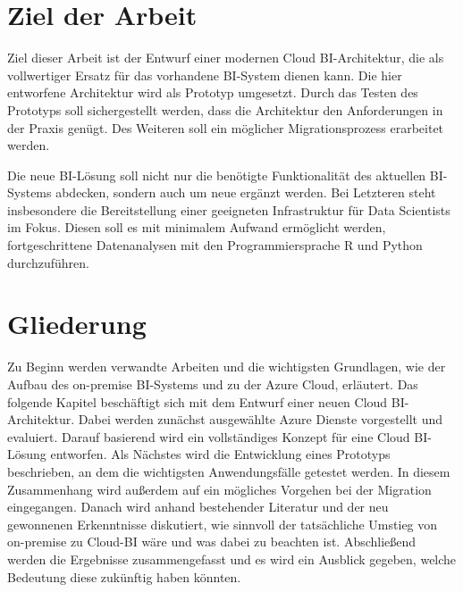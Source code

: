 \section{Ziel der Arbeit} \label{sec:intro:ziele}
Ziel dieser Arbeit ist der Entwurf einer modernen Cloud BI-Architektur, die als vollwertiger Ersatz für das vorhandene BI-System dienen kann. Die hier entworfene Architektur wird als Prototyp umgesetzt. Durch das Testen des Prototyps soll sichergestellt werden, dass die Architektur den Anforderungen in der Praxis genügt. Des Weiteren soll ein möglicher Migrationsprozess erarbeitet werden.

Die neue BI-Lösung soll nicht nur die benötigte Funktionalität des aktuellen BI-Systems abdecken, sondern auch um neue ergänzt werden. Bei Letzteren steht insbesondere die Bereitstellung einer geeigneten Infrastruktur für Data Scientists im Fokus. Diesen soll es mit minimalem Aufwand ermöglicht werden, fortgeschrittene Datenanalysen mit den Programmiersprache R und Python durchzuführen.

\section{Gliederung} \label{sec:intro:struktur}
Zu Beginn werden verwandte Arbeiten und die wichtigsten Grundlagen, wie der Aufbau des on-premise BI-Systems und zu der Azure Cloud, erläutert. Das folgende Kapitel beschäftigt sich mit dem Entwurf einer neuen Cloud BI-Architektur. Dabei werden zunächst ausgewählte Azure Dienste vorgestellt und evaluiert. Darauf basierend wird ein vollständiges Konzept für eine Cloud BI-Lösung entworfen. Als Nächstes wird die Entwicklung eines Prototyps beschrieben, an dem die wichtigsten Anwendungsfälle getestet werden. In diesem Zusammenhang wird außerdem auf ein mögliches Vorgehen bei der Migration eingegangen. Danach wird anhand bestehender Literatur und der neu gewonnenen Erkenntnisse diskutiert, wie sinnvoll der tatsächliche Umstieg von on-premise zu Cloud-BI wäre und was dabei zu beachten ist. Abschließend werden die Ergebnisse zusammengefasst und es wird ein Ausblick gegeben, welche Bedeutung diese zukünftig haben könnten.